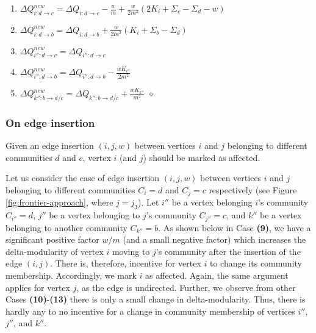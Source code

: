 \begin{enumerate}[start=4]
  \item $\Delta Q_{i:d \rightarrow c}^{new} = \Delta Q_{i:d \rightarrow c} - \frac{w}{m} + \frac{w}{2m^2} (2K_i + \Sigma_c - \Sigma_d - w)$
  \item $\Delta Q_{i:d \rightarrow b}^{new} = \Delta Q_{i:d \rightarrow b} + \frac{w}{2m^2} (K_i + \Sigma_b - \Sigma_d)$
  \item $\Delta Q_{i'':d \rightarrow c}^{new} = \Delta Q_{i'':d \rightarrow c}$
  \item $\Delta Q_{i'':d \rightarrow b}^{new} = \Delta Q_{i'':d \rightarrow b} - \frac{wK_{i''}}{2m^2}$
  \item $\Delta Q_{k'':b \rightarrow d/c}^{new} = \Delta Q_{k'':b \rightarrow d/c} + \frac{wK_{k''}}{m^2}$ \hfill $\diamond$
\end{enumerate}




\subsubsection{On edge insertion}

\begin{lemma}
\label{thm:louvain--mark-insertion}
Given an edge insertion $(i, j, w)$ between vertices $i$ and $j$ belonging to different communities $d$ and $c$, vertex $i$ (and $j$) should be marked as affected.
\end{lemma}

Let us consider the case of edge insertion $(i, j, w)$ between vertices $i$ and $j$ belonging to different communities $C_i = d$ and $C_j = c$ respectively (see Figure \ref{fig:frontier-approach}, where $j = j_3$). Let $i''$ be a vertex belonging $i$'s community $C_{i''} = d$, $j''$ be a vertex belonging to $j$'s community $C_{j''} = c$, and $k''$ be a vertex belonging to another community $C_{k''} = b$. As shown below in Case \textbf{(9)}, we have a significant positive factor $w/m$ (and a small negative factor) which increases the delta-modularity of vertex $i$ moving to $j$'s community after the insertion of the edge $(i, j)$. There is, therefore, incentive for vertex $i$ to change its community membership. Accordingly, we mark $i$ as affected. Again, the same argument applies for vertex $j$, as the edge is undirected. Further, we observe from other Cases \textbf{(10)}-\textbf{(13)} there is only a small change in delta-modularity. Thus, there is hardly any to no incentive for a change in community membership of vertices $i''$, $j''$, and $k''$.

